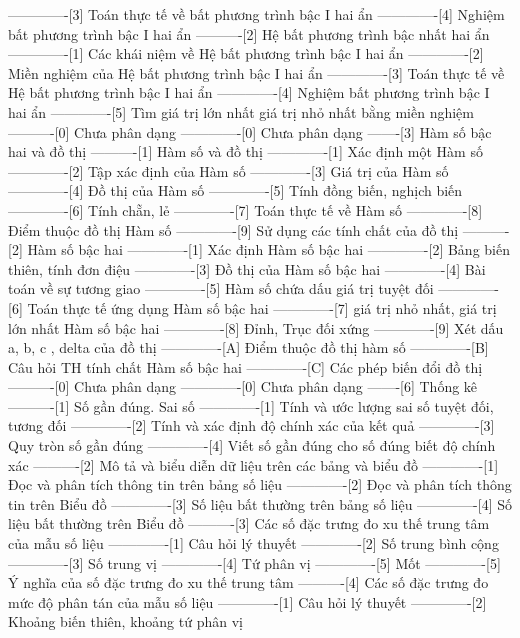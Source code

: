 -------------[3] Toán thực tế về bất phương trình bậc I hai ẩn
-------------[4] Nghiệm bất phương trình bậc I hai ẩn
----------[2] Hệ bất phương trình bậc nhất hai ẩn
-------------[1] Các khái niệm về Hệ bất phương trình bậc I hai ẩn
-------------[2] Miền nghiệm của Hệ bất phương trình bậc I hai ẩn
-------------[3] Toán thực tế về Hệ bất phương trình bậc I hai ẩn
-------------[4] Nghiệm bất phương trình bậc I hai ẩn
-------------[5] Tìm giá trị lớn nhất giá trị nhỏ nhất bằng miền nghiệm
----------[0] Chưa phân dạng
-------------[0] Chưa phân dạng
-------[3] Hàm số bậc hai và đồ thị
----------[1] Hàm số và đồ thị
-------------[1] Xác định một Hàm số
-------------[2] Tập xác định của Hàm số
-------------[3] Giá trị của Hàm số
-------------[4] Đồ thị của Hàm số
-------------[5] Tính đồng biến, nghịch biến
-------------[6] Tính chẵn, lẻ
-------------[7] Toán thực tế về Hàm số
-------------[8] Điểm thuộc đồ thị Hàm số
-------------[9] Sử dụng các tính chất của đồ thị
----------[2] Hàm số bậc hai
-------------[1] Xác định Hàm số bậc hai
-------------[2] Bảng biến thiên, tính đơn điệu
-------------[3] Đồ thị của Hàm số bậc hai
-------------[4] Bài toán về sự tương giao
-------------[5] Hàm số chứa dấu giá trị tuyệt đối
-------------[6] Toán thực tế ứng dụng Hàm số bậc hai
-------------[7] giá trị nhỏ nhất, giá trị lớn nhất Hàm số bậc hai
-------------[8] Đỉnh, Trục đối xứng
-------------[9] Xét dấu a, b, c , delta của đồ thị
-------------[A] Điểm thuộc đồ thị hàm số
-------------[B] Câu hỏi TH tính chất Hàm số bậc hai
-------------[C] Các phép biến đổi đồ thị 
----------[0] Chưa phân dạng
-------------[0] Chưa phân dạng
-------[6] Thống kê
----------[1] Số gần đúng. Sai số
-------------[1] Tính và ước lượng sai số tuyệt đối, tương đối
-------------[2] Tính và xác định độ chính xác của kết quả
-------------[3] Quy tròn số gần đúng
-------------[4] Viết số gần đúng cho số đúng biết độ chính xác
----------[2] Mô tả và biểu diễn dữ liệu trên các bảng và biểu đồ
-------------[1] Đọc và phân tích thông tin trên bảng số liệu
-------------[2] Đọc và phân tích thông tin trên Biểu đồ
-------------[3] Số liệu bất thường trên bảng số liệu
-------------[4] Số liệu bất thường trên Biểu đồ
----------[3] Các số đặc trưng đo xu thế trung tâm của mẫu số liệu
-------------[1] Câu hỏi lý thuyết
-------------[2] Số trung bình cộng
-------------[3] Số trung vị
-------------[4] Tứ phân vị
-------------[5] Mốt
-------------[5] Ý nghĩa của số đặc trưng đo xu thế trung tâm
----------[4] Các số đặc trưng đo mức độ phân tán của mẫu số liệu
-------------[1] Câu hỏi lý thuyết
-------------[2] Khoảng biến thiên, khoảng tứ phân vị
